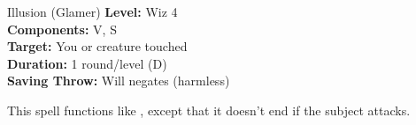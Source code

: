 {Illusion (Glamer)}
{
	\textbf{Level:}
	Wiz 4\\
	\textbf{Components:}
	V, S\\
	\textbf{Target:}
	You or creature touched\\
	\textbf{Duration:}
	1 round/level (D)\\
	\textbf{Saving Throw:}
	Will negates (harmless)\\
}
{
	This spell functions like , except that it doesn't end if the subject attacks.

}
